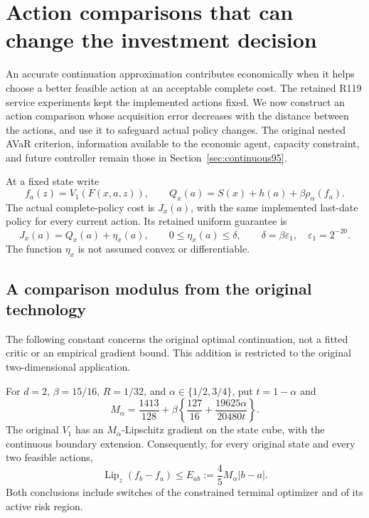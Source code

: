 \section{Action comparisons that can change the investment decision}
\label{sec:improvement120}
An accurate continuation approximation contributes economically when it
helps choose a better feasible action at an acceptable complete cost.
The retained R119 service experiments kept the implemented actions fixed.
We now construct an action comparison whose acquisition error decreases
with the distance between the actions, and use it to safeguard actual
policy changes.  The original nested AVaR criterion, information available
to the economic agent, capacity constraint, and future controller remain
those in Section~\ref{sec:continuous95}.

At a fixed state write
\[
 f_a(z)=V_1(F(x,a,z)),\qquad
 Q_x(a)=S(x)+h(a)+\beta\rho_\alpha(f_a).
\]
The actual complete-policy cost is $J_x(a)$, with the same implemented
last-date policy for every current action.  Its retained uniform guarantee is
\begin{equation}\label{eq:future120}
 J_x(a)=Q_x(a)+\eta_x(a),\qquad
 0\le\eta_x(a)\le\delta,\qquad
 \delta=\beta\varepsilon_1,\quad \varepsilon_1=2^{-20}.
\end{equation}
The function $\eta_x$ is not assumed convex or differentiable.

\subsection{A comparison modulus from the original technology}
The following constant concerns the original optimal continuation, not a
fitted critic or an empirical gradient bound.  This addition is restricted
to the original two-dimensional application.

\begin{theorem}
\label{thm:modulus120}
For $d=2$, $\beta=15/16$, $R=1/32$, and
$\alpha\in\{1/2,3/4\}$, put $t=1-\alpha$ and
\begin{equation}\label{eq:modulus120}
 M_\alpha=\frac{1413}{128}
       +\beta\left\{\frac{127}{16}
                 +\frac{19625\alpha}{20480t}\right\}.
\end{equation}
The original $V_1$ has an $M_\alpha$-Lipschitz gradient on the state
cube, with the continuous boundary extension.  Consequently, for every
original state and every two feasible actions,
\begin{equation}\label{eq:mixedmodulus120}
 \operatorname{Lip}_z(f_b-f_a)
 \le E_{ab}:=\frac45M_\alpha|b-a|.
\end{equation}
Both conclusions include switches of the constrained terminal optimizer
and of its active risk region.
\end{theorem}


